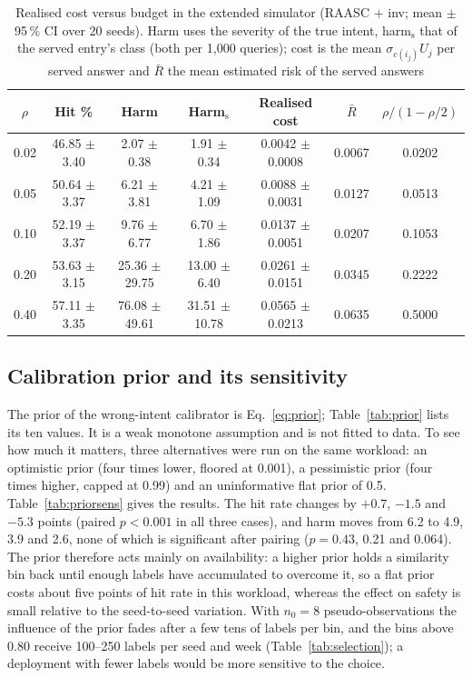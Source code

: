 \documentclass[journal]{IEEEtran}
\newcommand{\pct}{\,\%}
\begin{document}
\begin{table}[!t]
\caption{Realised cost versus budget in the extended simulator (RAASC $+$ inv; mean $\pm$ 95\pct{} CI over 20 seeds). Harm uses the severity of the true intent, harm$_{\text{s}}$ that of the served entry's class (both per 1,000 queries); cost is the mean $\sigma_{c(i_j)}U_j$ per served answer and $\bar R$ the mean estimated risk of the served answers}
\label{tab:consistency}
\centering\small
\begin{tabular}{ccccccc}
\toprule
$\rho$ & Hit \% & Harm & Harm$_{\text{s}}$ & Realised cost & $\bar R$ & $\rho/(1-\rho/2)$\\
\midrule
0.02 & 46.85 $\pm$ 3.40 & 2.07 $\pm$ 0.38 & 1.91 $\pm$ 0.34 & 0.0042 $\pm$ 0.0008 & 0.0067 & 0.0202\\
0.05 & 50.64 $\pm$ 3.37 & 6.21 $\pm$ 3.81 & 4.21 $\pm$ 1.09 & 0.0088 $\pm$ 0.0031 & 0.0127 & 0.0513\\
0.10 & 52.19 $\pm$ 3.37 & 9.76 $\pm$ 6.77 & 6.70 $\pm$ 1.86 & 0.0137 $\pm$ 0.0051 & 0.0207 & 0.1053\\
0.20 & 53.63 $\pm$ 3.15 & 25.36 $\pm$ 29.75 & 13.00 $\pm$ 6.40 & 0.0261 $\pm$ 0.0151 & 0.0345 & 0.2222\\
0.40 & 57.11 $\pm$ 3.35 & 76.08 $\pm$ 49.61 & 31.51 $\pm$ 10.78 & 0.0565 $\pm$ 0.0213 & 0.0635 & 0.5000\\
\bottomrule
\end{tabular}
\end{table}

\subsection{Calibration prior and its sensitivity}\label{sec:prior}
The prior of the wrong-intent calibrator is Eq.~\eqref{eq:prior}; Table~\ref{tab:prior} lists its ten values. It is a weak monotone assumption and is not fitted to data. To see how much it matters, three alternatives were run on the same workload: an optimistic prior (four times lower, floored at 0.001), a pessimistic prior (four times higher, capped at 0.99) and an uninformative flat prior of 0.5. Table~\ref{tab:priorsens} gives the results. The hit rate changes by $+0.7$, $-1.5$ and $-5.3$ points (paired $p<0.001$ in all three cases), and harm moves from 6.2 to 4.9, 3.9 and 2.6, none of which is significant after pairing ($p=0.43$, 0.21 and 0.064). The prior therefore acts mainly on availability: a higher prior holds a similarity bin back until enough labels have accumulated to overcome it, so a flat prior costs about five points of hit rate in this workload, whereas the effect on safety is small relative to the seed-to-seed variation. With $n_0=8$ pseudo-observations the influence of the prior fades after a few tens of labels per bin, and the bins above 0.80 receive 100--250 labels per seed and week (Table~\ref{tab:selection}); a deployment with fewer labels would be more sensitive to the choice.
\end{document}
